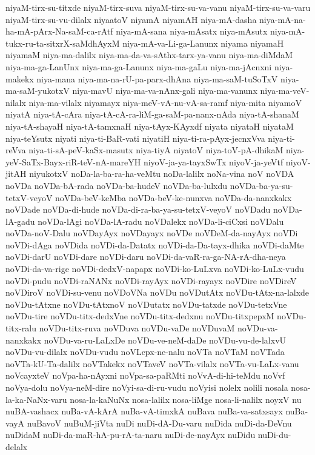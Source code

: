 {niyaM-tirx-su-titxde
niyaM-tirx-suva
niyaM-tirx-su-va-vanu
niyaM-tirx-su-va-varu
niyaM-tirx-su-vu-dilalx
niyaatoV
niyamA
niyamAH
niya-mA-dasha
niya-mA-na-ha-mA-pArx-Na-saM-ca-rAtf
niya-mA-sana
niya-mAsatx
niya-mAsutx
niya-mA-tukx-ru-ta-sitxrX-saMdhAyxM
niya-mA-va-Li-ga-Lanunx
niyama
niyamaH
niyamaM
niya-ma-dalilx
niya-ma-da-va-sAthx-tarx-ya-vanu
niya-ma-diMdaM
niya-ma-ga-LanUnx
niya-ma-ga-Lanunx
niya-ma-gaLu
niya-ma-jAcnxni
niya-makekx
niya-mana
niya-ma-na-rU-pa-parx-dhAna
niya-ma-saM-tuSoTxV
niya-ma-saM-yukotxV
niya-mavU
niya-ma-va-nAnx-gali
niya-ma-vanunx
niya-ma-veV-nilalx
niya-ma-vilalx
niyamayx
niya-meV-vA-nu-vA-sa-ramf
niya-mita
niyamoV
niyatA
niya-tA-cAra
niya-tA-cA-ra-liM-ga-saM-pa-nanx-nAda
niya-tA-shanaM
niya-tA-shayaH
niya-tA-tamxnaH
niya-tAyx-KAyxdf
niyata
niyataH
niyataM
niya-teYsutx
niyati
niya-ti-BaR-vati
niyatiH
niya-ti-ra-pAyx-jecnxVva
niya-ti-reVva
niya-ti-sA-peV-kaSx-masutx
niya-tiyA
niyatoV
niya-toV-pA-dhikaM
niya-yeV-SaTx-Bayx-riR-teV-nA-mareYH
niyoV-ja-ya-tayxSwTx
niyoV-ja-yeVtf
niyoV-jitAH
niyukotxV
noDa-la-ba-ra-ha-veMtu
noDa-lalilx
noNa-vina
noV
noVDA
noVDa
noVDa-bA-rada
noVDa-ba-hudeV
noVDa-ba-lulxdu
noVDa-ba-ya-su-tetxV-veyoV
noVDa-beV-keMba
noVDa-beV-ke-nunxva
noVDa-da-nanxkakx
noVDade
noVDa-di-hude
noVDa-di-ra-ba-ya-su-tetxV-veyoV
noVDadu
noVDa-lA-gadu
noVDa-lAgi
noVDa-lA-radu
noVDalekx
noVDa-li-ciCxsi
noVDalu
noVDa-noV-Dalu
noVDayAyx
noVDayayx
noVDe
noVDeM-da-nayAyx
noVDi
noVDi-dAga
noVDida
noVDi-da-Datatx
noVDi-da-Da-tayx-dhika
noVDi-daMte
noVDi-darU
noVDi-dare
noVDi-daru
noVDi-da-vaR-ra-ga-NA-rA-dha-neya
noVDi-da-va-rige
noVDi-dedxV-napapx
noVDi-ko-LuLxva
noVDi-ko-LuLx-vudu
noVDi-pudu
noVDi-raNANx
noVDi-rayAyx
noVDi-rayayx
noVDire
noVDireV
noVDiroV
noVDi-su-venu
noVDoVNa
noVDu
noVDutAtx
noVDu-tAtx-na-lalxde
noVDu-tAtxne
noVDu-tAtxnoV
noVDutatx
noVDu-tatxde
noVDu-tetxVne
noVDu-tire
noVDu-titx-dedxVne
noVDu-titx-dedxnu
noVDu-titxpepxM
noVDu-titx-ralu
noVDu-titx-ruva
noVDuva
noVDu-vaDe
noVDuvaM
noVDu-va-nanxkakx
noVDu-va-ru-LaLxDe
noVDu-ve-neM-daDe
noVDu-vu-de-lalxvU
noVDu-vu-dilalx
noVDu-vudu
noVLepx-ne-nalu
noVTa
noVTaM
noVTada
noVTa-kU-Ta-dalilx
noVTakekx
noVTaveV
noVTa-vilalx
noVTa-vu-LaLx-vanu
noVcayxteV
noVpa-ha-nAyxni
noVpa-sa-paRMti
noVvA-di-hi-teMdu
noVvf
noVya-dolu
noVya-neM-dire
noVyi-sa-di-ru-vudu
noVyisi
nolelx
nolili
nosala
nosa-la-ka-NaNx-varu
nosa-la-kaNuNx
nosa-lalilx
nosa-liMge
nosa-li-nalilx
noyxV
nu
nuBA-vashacx
nuBa-vA-kArA
nuBa-vA-timxkA
nuBava
nuBa-va-satxsayx
nuBa-vayA
nuBavoV
nuBuM-jiVta
nuDi
nuDi-dA-Du-varu
nuDida
nuDi-da-DeVnu
nuDidaM
nuDi-da-maR-hA-pu-rA-ta-naru
nuDi-de-nayAyx
nuDidu
nuDi-du-delalx
}

